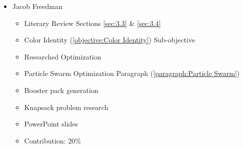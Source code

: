 \documentclass[12pt, letterpaper]{article}
\begin{document}
\begin{itemize}
\begin{itemize}
\end{itemize}

\item Jacob Freedman

\begin{itemize}

    \item Literary Review Sections \ref{sec:3.3} \& \ref{sec:3.4}
    \item Color Identity (\ref{objective:Color Identity}) Sub-objective
    \item Researched Optimization
    \item Particle Swarm Optimization Paragraph (\ref{paragraph:Particle Swarm})
	\item Booster pack generation
	\item Knapsack problem research
	\item PowerPoint slides
    \item Contribution: 20\%

\end{itemize}

\end{itemize}
\end{document}
